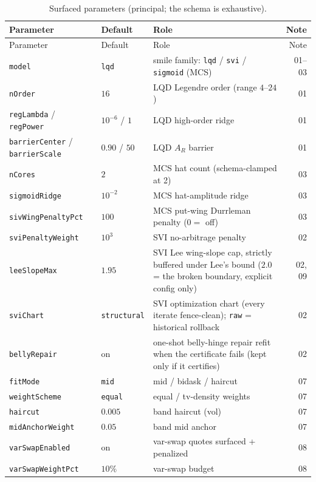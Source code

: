 \documentclass[11pt]{article}
\begin{document}
\small
\setlength{\tabcolsep}{4pt}
\begin{longtable}{p{}p{}p{}r}
\caption{Surfaced parameters (principal; the schema is exhaustive).}\label{tab:master_surfaced}\\
\toprule
Parameter & Default & Role & Note\\
\midrule
\endfirsthead
\toprule Parameter & Default & Role & Note\\ \midrule
\endhead
\texttt{model} & \texttt{lqd} & smile family: \texttt{lqd} / \texttt{svi} /
\texttt{sigmoid} (MCS) & 01--03\\
\texttt{nOrder} & $16$ & LQD Legendre order (range $4$--$24$) & 01\\
\texttt{regLambda} / \texttt{regPower} & $10^{-6}$ / $1$ & LQD high-order ridge & 01\\
\texttt{barrierCenter} / \texttt{barrierScale} & $0.90$ / $50$ & LQD $A_R$ barrier & 01\\
\texttt{nCores} & $2$ & MCS hat count (schema-clamped at 2) & 03\\
\texttt{sigmoidRidge} & $10^{-2}$ & MCS hat-amplitude ridge & 03\\
\texttt{sivWingPenaltyPct} & $100$ & MCS put-wing Durrleman penalty ($0=$ off) & 03\\
\texttt{sviPenaltyWeight} & $10^{3}$ & SVI no-arbitrage penalty & 02\\
\texttt{leeSlopeMax} & $1.95$ & SVI Lee wing-slope cap, strictly buffered
under Lee's bound ($2.0$ = the broken boundary, explicit config only) & 02, 09\\
\texttt{sviChart} & \texttt{structural} & SVI optimization chart (every
iterate fence-clean); \texttt{raw} = historical rollback & 02\\
\texttt{bellyRepair} & on & one-shot belly-hinge repair refit when the
certificate fails (kept only if it certifies) & 02\\
\texttt{fitMode} & \texttt{mid} & mid / bidask / haircut & 07\\
\texttt{weightScheme} & \texttt{equal} & equal / tv-density weights & 07\\
\texttt{haircut} & $0.005$ & band haircut (vol) & 07\\
\texttt{midAnchorWeight} & $0.05$ & band mid anchor & 07\\
\texttt{varSwapEnabled} & on & var-swap quotes surfaced + penalized & 08\\
\texttt{varSwapWeightPct} & $10\%$ & var-swap budget & 08\\

\end{longtable}
\end{document}

